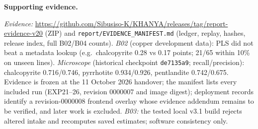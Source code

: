 \documentclass[10pt,a4paper,twocolumn]{article}
\newcommand{\backsec}[1]{\par\smallskip\noindent\textbf{#1}\quad\ignorespaces}
\newcommand{\sha}[1]{\texttt{#1}}
\begin{document}
\backsec{Supporting evidence.}\label{app:micro}\label{app:impl}\label{app:repro}
{\raggedright
\noindent\emph{Evidence:} \url{https://github.com/Sibusiso-K/KHANYA/releases/tag/report-evidence-v20} (ZIP) and \texttt{report/EVIDENCE\_MANIFEST.md} (ledger, replay, hashes, release index, full B02/B04 counts). \emph{B02} (copper development data): PLS did not beat a metadata lookup (e.g.\ chalcopyrite 0.28 vs 0.17 points; 21/65 within 10\% on unseen lines). \emph{Microscope} (historical checkpoint \sha{de7135a9}; recall/precision): chalcopyrite 0.716/0.746, pyrrhotite 0.934/0.926, pentlandite 0.742/0.675. Evidence is frozen at the 11 October 2026 handover; the manifest lists every included run (EXP21--26, revision 0000007 and image digest); deployment records identify a revision-0000008 frontend overlay whose evidence addendum remains to be verified, and later work is excluded. \emph{B03:} the tested local v3.1 build rejects altered intake and recomputes saved estimates; software consistency only.\par}
\end{document}
